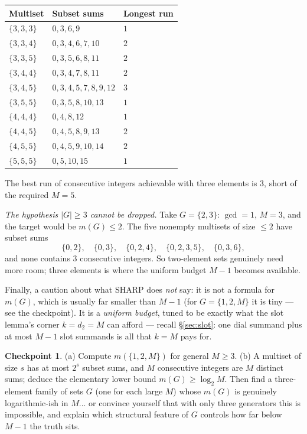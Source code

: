 \documentclass[11pt,reqno]{amsart}
\theoremstyle{plain}
\theoremstyle{definition}
\newtheorem{checkpoint}[theorem]{Checkpoint}   %
\theoremstyle{remark}
\begin{document}
\begin{center}\small
\begin{tabular}{@{}lll@{}}
\toprule
Multiset & Subset sums & Longest run \\
\midrule
$\{3,3,3\}$ & $0,3,6,9$ & $1$ \\
$\{3,3,4\}$ & $0,3,4,6,7,10$ & $2$ \\
$\{3,3,5\}$ & $0,3,5,6,8,11$ & $2$ \\
$\{3,4,4\}$ & $0,3,4,7,8,11$ & $2$ \\
$\{3,4,5\}$ & $0,3,4,5,7,8,9,12$ & $3$ \\
$\{3,5,5\}$ & $0,3,5,8,10,13$ & $1$ \\
$\{4,4,4\}$ & $0,4,8,12$ & $1$ \\
$\{4,4,5\}$ & $0,4,5,8,9,13$ & $2$ \\
$\{4,5,5\}$ & $0,4,5,9,10,14$ & $2$ \\
$\{5,5,5\}$ & $0,5,10,15$ & $1$ \\
\bottomrule
\end{tabular}
\end{center}

The best run of consecutive integers achievable with three elements is $3$,
short of the required $M = 5$.

\emph{The hypothesis $|G| \ge 3$ cannot be dropped.} Take $G = \{2, 3\}$: $\gcd =
1$, $M = 3$, and the target would be $m(G) \le 2$. The five nonempty multisets of
size $\le 2$ have subset sums
\[
  \{0,2\},\quad \{0,3\},\quad \{0,2,4\},\quad \{0,2,3,5\},\quad \{0,3,6\} ,
\]
and none contains $3$ consecutive integers. So two-element sets genuinely need
more room; three elements is where the uniform budget $M-1$ becomes available.

Finally, a caution about what SHARP does \emph{not} say: it is not a formula for
$m(G)$, which is usually far smaller than $M-1$ (for $G = \{1, 2, M\}$ it is
tiny --- see the checkpoint). It is a \emph{uniform budget},
tuned to be exactly what the slot lemma's corner $k = d_2 = M$ can afford ---
recall \S\ref{sec:slot}: one dial summand plus at most $M - 1$ slot summands is all
that $k = M$ pays for.

\begin{checkpoint}
(a) Compute $m(\{1, 2, M\})$ for general $M \ge 3$.
(b) A multiset of size $s$ has at most $2^s$ subset sums, and $M$ consecutive
integers are $M$ distinct sums; deduce the elementary lower bound $m(G) \ge \log_2
M$. Then find a three-element family of sets $G$ (one for each large $M$) whose
$m(G)$ is genuinely logarithmic-ish in $M$... or convince yourself that with only
three generators this is impossible, and explain which structural feature of $G$
controls how far below $M - 1$ the truth sits.
\end{checkpoint}
\end{document}
